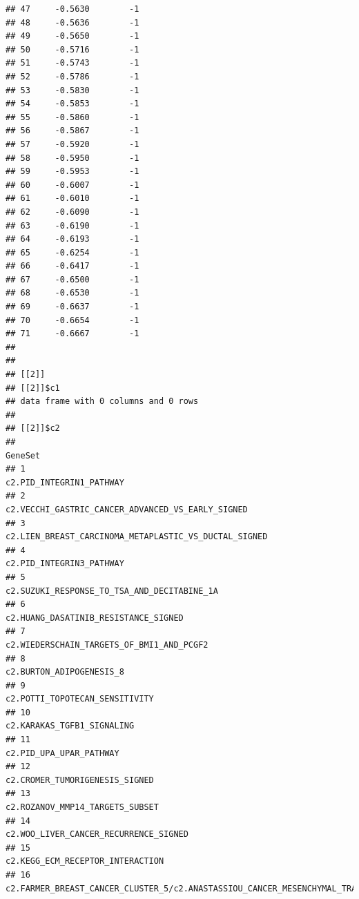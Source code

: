 \documentclass{article}\usepackage[]{graphicx}\usepackage[]{color}
\makeatletter
\newenvironment{kframe}{%
 \def\at@end@of@kframe{}%
 \ifinner\ifhmode%
  \def\at@end@of@kframe{\end{minipage}}%
  \begin{minipage}{\columnwidth}%
 \fi\fi%
 \def\FrameCommand##1{\hskip\@totalleftmargin \hskip-\fboxsep
 \colorbox{shadecolor}{##1}\hskip-\fboxsep
     \hskip-\linewidth \hskip-\@totalleftmargin \hskip\columnwidth}%
 \MakeFramed {\advance\hsize-\width
   \@totalleftmargin\z@ \linewidth\hsize
   \@setminipage}}%
 {\par\unskip\endMakeFramed%
 \at@end@of@kframe}
\newenvironment{knitrout}{}{} %
\makeatother
\begin{document}
\begin{knitrout}
\begin{kframe}
\begin{verbatim}
## 47     -0.5630        -1
## 48     -0.5636        -1
## 49     -0.5650        -1
## 50     -0.5716        -1
## 51     -0.5743        -1
## 52     -0.5786        -1
## 53     -0.5830        -1
## 54     -0.5853        -1
## 55     -0.5860        -1
## 56     -0.5867        -1
## 57     -0.5920        -1
## 58     -0.5950        -1
## 59     -0.5953        -1
## 60     -0.6007        -1
## 61     -0.6010        -1
## 62     -0.6090        -1
## 63     -0.6190        -1
## 64     -0.6193        -1
## 65     -0.6254        -1
## 66     -0.6417        -1
## 67     -0.6500        -1
## 68     -0.6530        -1
## 69     -0.6637        -1
## 70     -0.6654        -1
## 71     -0.6667        -1
## 
## 
## [[2]]
## [[2]]$c1
## data frame with 0 columns and 0 rows
## 
## [[2]]$c2
##                                                                                                   GeneSet
## 1                                                                                c2.PID_INTEGRIN1_PATHWAY
## 2                                                       c2.VECCHI_GASTRIC_CANCER_ADVANCED_VS_EARLY_SIGNED
## 3                                                   c2.LIEN_BREAST_CARCINOMA_METAPLASTIC_VS_DUCTAL_SIGNED
## 4                                                                                c2.PID_INTEGRIN3_PATHWAY
## 5                                                             c2.SUZUKI_RESPONSE_TO_TSA_AND_DECITABINE_1A
## 6                                                                    c2.HUANG_DASATINIB_RESISTANCE_SIGNED
## 7                                                               c2.WIEDERSCHAIN_TARGETS_OF_BMI1_AND_PCGF2
## 8                                                                                c2.BURTON_ADIPOGENESIS_8
## 9                                                                          c2.POTTI_TOPOTECAN_SENSITIVITY
## 10                                                                             c2.KARAKAS_TGFB1_SIGNALING
## 11                                                                                c2.PID_UPA_UPAR_PATHWAY
## 12                                                                         c2.CROMER_TUMORIGENESIS_SIGNED
## 13                                                                        c2.ROZANOV_MMP14_TARGETS_SUBSET
## 14                                                                  c2.WOO_LIVER_CANCER_RECURRENCE_SIGNED
## 15                                                                       c2.KEGG_ECM_RECEPTOR_INTERACTION
## 16 c2.FARMER_BREAST_CANCER_CLUSTER_5/c2.ANASTASSIOU_CANCER_MESENCHYMAL_TRANSITION_SIGNATURE/c4.GNF2_CDH11

\end{verbatim}
\end{kframe}
\end{knitrout}
\end{document}
